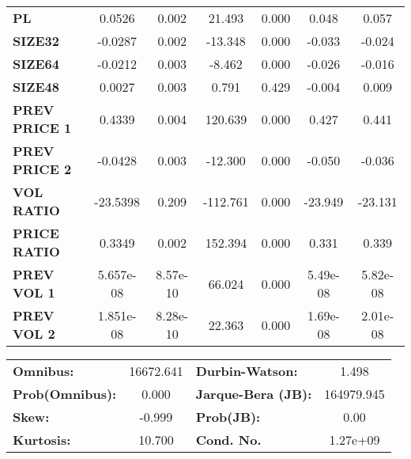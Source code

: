 \begin{center}
\begin{tabular}{lcccccc}
\textbf{PL}    &       0.0526  &        0.002     &    21.493  &         0.000        &        0.048    &        0.057     \\
\textbf{SIZE32}    &      -0.0287  &        0.002     &   -13.348  &         0.000        &       -0.033    &       -0.024     \\
\textbf{SIZE64}    &      -0.0212  &        0.003     &    -8.462  &         0.000        &       -0.026    &       -0.016     \\
\textbf{SIZE48}   &       0.0027  &        0.003     &     0.791  &         0.429        &       -0.004    &        0.009     \\
\textbf{PREV PRICE 1}   &       0.4339  &        0.004     &   120.639  &         0.000        &        0.427    &        0.441     \\
\textbf{PREV PRICE 2}   &      -0.0428  &        0.003     &   -12.300  &         0.000        &       -0.050    &       -0.036     \\
\textbf{VOL RATIO}   &     -23.5398  &        0.209     &  -112.761  &         0.000        &      -23.949    &      -23.131     \\
\textbf{PRICE RATIO}   &       0.3349  &        0.002     &   152.394  &         0.000        &        0.331    &        0.339     \\
\textbf{PREV VOL 1}   &    5.657e-08  &     8.57e-10     &    66.024  &         0.000        &     5.49e-08    &     5.82e-08     \\
\textbf{PREV VOL 2}   &    1.851e-08  &     8.28e-10     &    22.363  &         0.000        &     1.69e-08    &     2.01e-08     \\
\bottomrule
\end{tabular}
\begin{tabular}{lclc}
\textbf{Omnibus:}       & 16672.641 & \textbf{  Durbin-Watson:     } &     1.498   \\
\textbf{Prob(Omnibus):} &    0.000  & \textbf{  Jarque-Bera (JB):  } & 164979.945  \\
\textbf{Skew:}          &   -0.999  & \textbf{  Prob(JB):          } &      0.00   \\
\textbf{Kurtosis:}      &   10.700  & \textbf{  Cond. No.          } &  1.27e+09   \\
\bottomrule
\end{tabular}
\end{center}
